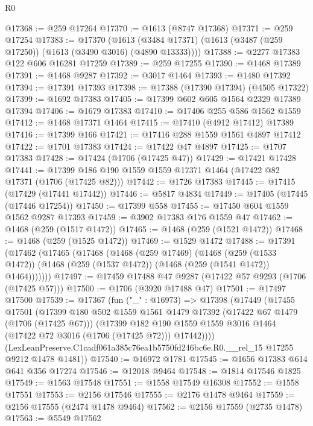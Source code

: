 \begin{lexlean}{R0}
\begin{coremodule}
@17368 := @259 @17264
@17370 := @1613 (@8747 @17368)
@17371 := @259 @17254
@17383 := @17370
    (@1613 (@3484 @17371) (@1613 (@3487 (@259 @17250)) (@1613 (@3490 @3016) (@4890 @13333))))
@17388 := @2277 @17383 @122 @606 @16281 @17259
@17389 := @259 @17255
@17390 := @1468 @17389
@17391 := @1468 @9287
@17392 := @3017 @1464
@17393 := @1480 @17392
@17394 := @17391 @17393
@17398 := @17388 (@17390 @17394) (@4505 @17322)
@17399 := @1692 @17383
@17405 := @17399 @602 @605 @1564 @2329 @17389 @17394
@17406 := @1679 @17383
@17410 := @17406 @255 @586 @1562 @1559
@17412 := @1468 @17371 @1464
@17415 := @17410 (@4912 @17412) @17389
@17416 := @17399 @166
@17421 := @17416 @288 @1559 @1561 @4897 @17412
@17422 := @1701 @17383
@17424 := @17422 @47 @4897
@17425 := @1707 @17383
@17428 := @17424 (@1706 (@17425 @47))
@17429 := @17421 @17428
@17441 := @17399 @186 @190 @1559 @1559 @17371 @1464 (@17422 @82 @17371 (@1706 (@17425 @82)))
@17442 := @1726 @17383
@17445 := @17415 (@17429 (@17441 @17442))
@17446 := @5817 @4834
@17449 := @17405 (@17445 (@17446 @17254))
@17450 := @17399 @558
@17455 := @17450 @604 @1559 @1562 @9287 @17393
@17459 := @3902 @17383 @176 @1559 @47
@17462 := @1468 (@259 (@1517 @1472))
@17465 := @1468 (@259 (@1521 @1472))
@17468 := @1468 (@259 (@1525 @1472))
@17469 := @1529 @1472
@17488 := @17391
    (@17462
      (@17465
        (@17468
          (@1468
            (@259 @17469)
            (@1468
              (@259 (@1533 @1472))
              (@1468 (@259 (@1537 @1472)) (@1468 (@259 (@1541 @1472)) @1464)))))))
@17497 := @17459 @17488 @47 @9287 (@17422 @57 @9293 (@1706 (@17425 @57)))
@17500 := @1706 (@3920 @17488 @47)
@17501 := @17497 @17500
@17539 := @17367
    (fun ("_" : @16973) =>
    @17398
      (@17449
        (@17455
          @17501
          (@17399
            @180
            @502
            @1559
            @1561
            @1479
            @17392
            (@17422 @67 @1479 (@1706 (@17425 @67)))
            (@17399
              @182
              @190
              @1559
              @1559
              @3016
              @1464
              (@17422 @72 @3016 (@1706 (@17425 @72)))
              @17442))))
      (LexLeanPreserve.C1cadf061a385c76ea1b5750fd246bc6e.R0.__rel_15 @17255 @9212 @1478 @1481))
@17540 := @16972 @1781
@17545 := @1656 @17383 @614 @641 @356 @17274
@17546 := @12018 @9464
@17548 := @1814 @17546 @1825
@17549 := @1563 @17548
@17551 := @1558 @17549 @16308
@17552 := @1558 @17551
@17553 := @2156 @17546
@17555 := @2176 @1478 @9464
@17559 := @2156 @17555 (@2474 @1478 @9464)
@17562 := @2156 @17559 (@2735 @1478)
@17563 := @5549 @17562

\end{coremodule}
\end{lexlean}
